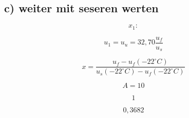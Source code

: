 \subsection*{c) weiter mit seseren werten}

\[
x_{1}:
\]

\[
u_{1} = u_{u} = 32,70 \frac{u_{f}}{u_{s}}
\]

\[
x = \frac{u_{f} - u_{f}(-22^{\circ}C)}{u_{s}(-22^{\circ}C) - u_{f}(-22^{\circ}C)}
\]

\[
A = 10
\]

\[
1
\]

\[
0,3682
\]